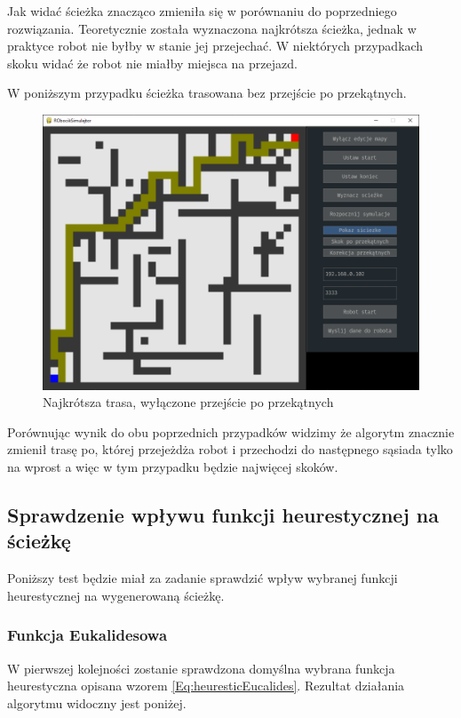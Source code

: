 Jak widać ścieżka znacząco zmieniła się w porównaniu do poprzedniego rozwiązania. Teoretycznie została wyznaczona najkrótsza 
ścieżka, jednak w praktyce robot nie byłby w stanie jej przejechać. 
W niektórych przypadkach skoku widać że robot nie miałby miejsca na przejazd.

W poniższym przypadku ścieżka trasowana bez przejście po przekątnych. 

\begin{figure}[H]
	\centering
	\includegraphics[width=12cm]{pages/testy/zdjecia/t2_3.png}
	\caption{Najkrótsza trasa, wyłączone przejście po przekątnych}
\end{figure}
Porównując wynik do obu poprzednich przypadków widzimy że algorytm znacznie zmienił trasę po, której przejeżdża robot
i przechodzi do następnego sąsiada tylko na wprost a więc w tym przypadku będzie najwięcej skoków.


\subsection{Sprawdzenie wpływu funkcji heurestycznej na ścieżkę}
Poniższy test będzie miał za zadanie sprawdzić wpływ wybranej funkcji heurestycznej na wygenerowaną ścieżkę.
\subsubsection{Funkcja Eukalidesowa}
W pierwszej kolejności zostanie sprawdzona domyślna wybrana funkcja heurestyczna opisana wzorem \eqref{Eq:heuresticEucalides}.
Rezultat działania algorytmu widoczny jest poniżej.


